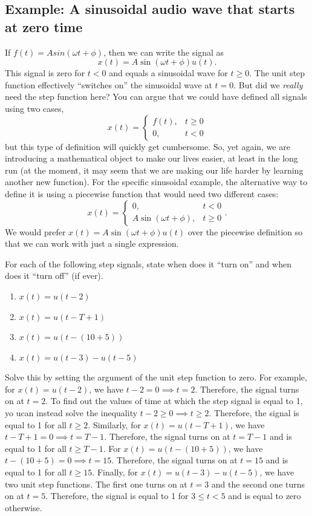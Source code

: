 \subsection{Example: A sinusoidal audio wave that starts at zero time}
If $f(t) = A sin(\omega t + \phi)$, then we can write the signal as 
\[
x(t) = A \sin(\omega t + \phi) u(t).
\]
This signal is zero for $t < 0$ and equals a sinusoidal wave for $t \geq 0$. The unit step function effectively ``switches on'' the sinusoidal wave at $t = 0$. 
But did we \emph{really} need the step function here? You can argue that we could have defined all signals using two cases, 
\[
x(t) = \begin{cases}
f(t), & t \geq 0 \\
0, & t < 0
\end{cases}
\]
but this type of definition will quickly get cumbersome. So, yet again, we are introducing a mathematical object to make our lives easier, at least in the long run (at the moment, it may seem that we are making our life harder by learning another new function).
For the specific sinusoidal example, the alternative way to define it is using a piecewise function that would need two different cases:
\[
x(t) = \begin{cases}
0, & t < 0 \\
A \sin(\omega t + \phi), & t \geq 0
\end{cases}.
\]
We would prefer $x(t) = A \sin(\omega t + \phi) u(t)$ over the piecewise definition so that we can work with just a single expression. 
\begin{popquiz}
  For each of the following step signals, state when does it ``turn on'' and when does it ``turn off'' (if ever).
  \begin{enumerate}
      \item $x(t) = u(t - 2)$
      \item $x(t) = u(t - T + 1)$
      \item $x(t) = u(t - (10 + 5))$
      \item $x(t) = u(t - 3) - u(t - 5)$
  \end{enumerate}
  \popqsplit
  Solve this by setting the argument of the unit step function to zero. For example, for $x(t) = u(t - 2)$, we have $t - 2 = 0 \implies t = 2$. Therefore, the signal turns on at $t = 2$. To find out the values of time at which the step signal is equal to 1, yo ucan instead solve the inequality $t - 2 \geq 0 \implies t \geq 2$. Therefore, the signal is equal to 1 for all $t \geq 2$. Similarly, for $x(t) = u(t - T + 1)$, we have $t - T + 1 = 0 \implies t = T - 1$. Therefore, the signal turns on at $t = T - 1$ and is equal to 1 for all $t \geq T - 1$. For $x(t) = u(t - (10 + 5))$, we have $t - (10 + 5) = 0 \implies t = 15$. Therefore, the signal turns on at $t = 15$ and is equal to 1 for all $t \geq 15$. Finally, for $x(t) = u(t - 3) - u(t - 5)$, we have two unit step functions. The first one turns on at $t = 3$ and the second one turns on at $t = 5$. Therefore, the signal is equal to 1 for $3 \leq t < 5$ and is equal to zero otherwise.
\end{popquiz}
